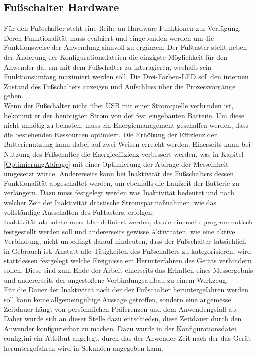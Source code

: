 \subsection{Fußschalter Hardware}
Für den Fußschalter steht eine Reihe an Hardware Funktionen zur Verfügung. Deren Funktionalität muss evaluiert und eingebunden werden um die Funktionsweise der Anwendung sinnvoll zu ergänzen. Der Fußtaster stellt neben der Änderung der Konfigurationsdateien die einzigste Möglichkeit für den Anwender da, um mit dem Fußschalter zu interagieren, weshalb sein Funktionsumfang maximiert werden soll. Die Drei-Farben-LED soll den internen Zustand des Fußschalters anzeigen und Aufschluss über die Prozessvorgänge geben.\\
Wenn der Fußschalter nicht über \ac{USB} mit einer Stromquelle verbunden ist, bekommt er den benötigten Strom von der fest eingebauten Batterie. Um diese nicht unnötig zu belasten, muss ein Energiemanagement geschaffen werden, dass die bestehenden Ressourcen optimiert. Die Erhöhung der Effizienz der Batterienutzung kann dabei auf zwei Weisen erreicht werden. Einerseits kann bei Nutzung des Fußschalter die Energieeffizienz verbessert werden, was in Kapitel \ref{OptimierungAbfrage} mit einer Optimierung der Abfrage der Messeinheit umgesetzt wurde. Andererseits kann bei Inaktivität des Fußschalters dessen Funktionalität abgeschaltet werden, um ebenfalls die Laufzeit der Batterie zu verlängern. Dazu muss festgelegt werden was Inaktivität bedeutet und nach welcher Zeit der Inaktivität drastische Stromsparmaßnahmen, wie das vollständige Ausschalten des Fußtasters, erfolgen.\\
Inaktivität als solche muss klar definiert werden, da sie einerseits programmatisch festgestellt werden soll und andererseits gewisse Aktivitäten, wie eine aktive Verbindung, nicht unbedingt darauf hindeuten, dass der Fußschalter tatsächlich in Gebrauch ist. Anstatt alle Tätigkeiten des Fußschalters zu kategorisieren, wird stattdessen festgelegt welche Ereignisse ein Herunterfahren des Geräts verhindern sollen. Diese sind zum Ende der Arbeit einerseits das Erhalten eines Messergebnis und andererseits der angestoßene Verbindungsaufbau zu einem Werkzeug.\\
Für die Dauer der Inaktivität nach der der Fußschalter heruntergefahren werden soll kann keine allgemeingültige Aussage getroffen, sondern eine angemesse Zeitdauer hängt von persöhnlichen Präferenzen und dem Anwendungsfall ab. Daher wurde sich an dieser Stelle dazu entschieden, diese Zeitdauer durch den Anwender konfigurierbar zu machen. Dazu wurde in der Konfigurationsdatei config.ini ein Attribut angelegt, durch das der Anwender Zeit nach der das Gerät heruntergefahren wird in Sekunden angegeben kann.